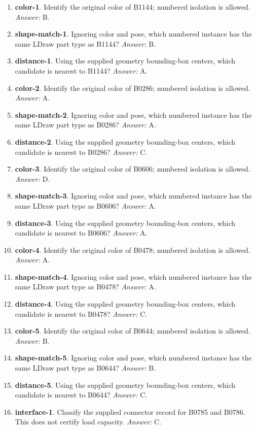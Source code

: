 \begin{enumerate}
\item \textbf{color-1}. Identify the original color of B1144; numbered isolation is allowed. \textit{Answer:} B.
\item \textbf{shape-match-1}. Ignoring color and pose, which numbered instance has the same LDraw part type as B1144? \textit{Answer:} B.
\item \textbf{distance-1}. Using the supplied geometry bounding-box centers, which candidate is nearest to B1144? \textit{Answer:} A.
\item \textbf{color-2}. Identify the original color of B0286; numbered isolation is allowed. \textit{Answer:} A.
\item \textbf{shape-match-2}. Ignoring color and pose, which numbered instance has the same LDraw part type as B0286? \textit{Answer:} A.
\item \textbf{distance-2}. Using the supplied geometry bounding-box centers, which candidate is nearest to B0286? \textit{Answer:} C.
\item \textbf{color-3}. Identify the original color of B0606; numbered isolation is allowed. \textit{Answer:} D.
\item \textbf{shape-match-3}. Ignoring color and pose, which numbered instance has the same LDraw part type as B0606? \textit{Answer:} A.
\item \textbf{distance-3}. Using the supplied geometry bounding-box centers, which candidate is nearest to B0606? \textit{Answer:} A.
\item \textbf{color-4}. Identify the original color of B0478; numbered isolation is allowed. \textit{Answer:} A.
\item \textbf{shape-match-4}. Ignoring color and pose, which numbered instance has the same LDraw part type as B0478? \textit{Answer:} A.
\item \textbf{distance-4}. Using the supplied geometry bounding-box centers, which candidate is nearest to B0478? \textit{Answer:} C.
\item \textbf{color-5}. Identify the original color of B0644; numbered isolation is allowed. \textit{Answer:} B.
\item \textbf{shape-match-5}. Ignoring color and pose, which numbered instance has the same LDraw part type as B0644? \textit{Answer:} B.
\item \textbf{distance-5}. Using the supplied geometry bounding-box centers, which candidate is nearest to B0644? \textit{Answer:} C.
\item \textbf{interface-1}. Classify the supplied connector record for B0785 and B0786. This does not certify load capacity. \textit{Answer:} C.

\end{enumerate}
